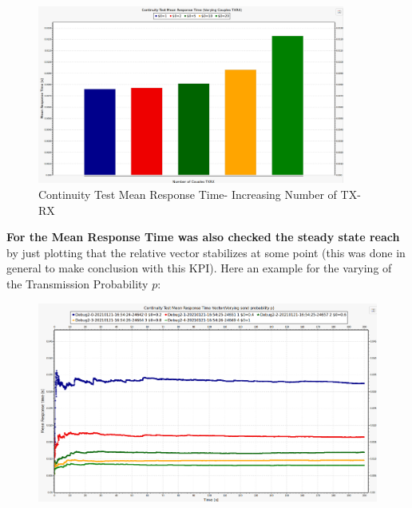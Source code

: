 \begin{itemize}
	\begin{figure}[H]
		\centering
		\includegraphics[width=0.9\textwidth]{img/ContinuityTest_ResponseTIme_TXRXVarying}
		\caption{Continuity Test Mean Response Time- Increasing Number of TX-RX}
		\label {img: continuityTestTXRXResponse}
	\end{figure}
\end{itemize} 
\textbf{For the Mean Response Time was also checked the steady state reach} by just plotting that the relative vector stabilizes at some point (this was done in general to make conclusion with this KPI). Here an example for the varying of the Transmission Probability $p$:
\begin{figure}[H]
	\centering
	\includegraphics[width=\textwidth]{img/ContinuityTest_ResponseTime_VectorP.png}
	\label {img: responseTimeConvergence}
\end{figure}
